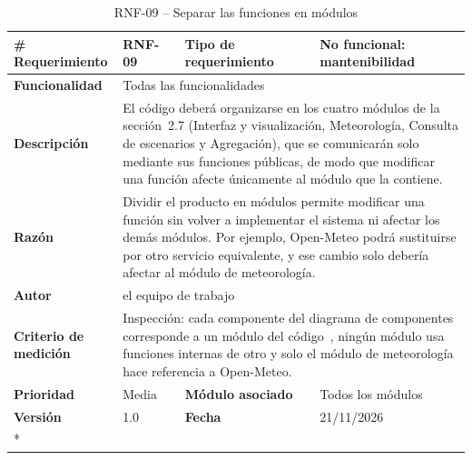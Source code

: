 \begin{longtable}{|p{\rqA}|p{\rqB}|p{\rqC}|p{\rqD}|}
  \caption{RNF-09 -- Separar las funciones en módulos}\label{tab:rnf-09}\tabularnewline
  \hline
  \textbf{\# Requerimiento} & RNF-09 & \raggedright\textbf{Tipo de requerimiento} & No funcional: mantenibilidad\tabularnewline\hline
  \raggedright\textbf{Funcionalidad} & \multicolumn{3}{p{\rqBCD}|}{Todas las funcionalidades}\tabularnewline\hline
  \endfirsthead
  \textbf{Descripción} & \multicolumn{3}{p{\rqBCD}|}{El código deberá organizarse en los cuatro módulos de la sección~2.7 (Interfaz y visualización, Meteorología, Consulta de escenarios y Agregación), que se comunicarán solo mediante sus funciones públicas, de modo que modificar una función afecte únicamente al módulo que la contiene.}\tabularnewline\hline
  \textbf{Razón} & \multicolumn{3}{p{\rqBCD}|}{Dividir el producto en módulos permite modificar una función sin volver a implementar el sistema ni afectar los demás módulos. Por ejemplo, Open-Meteo podrá sustituirse por otro servicio equivalente, y ese cambio solo debería afectar al módulo de meteorología.}\tabularnewline\hline
  \textbf{Autor} & \multicolumn{3}{p{\rqBCD}|}{el equipo de trabajo}\tabularnewline\hline
  \raggedright\textbf{Criterio de medición} & \multicolumn{3}{p{\rqBCD}|}{Inspección: cada componente del diagrama de componentes corresponde a un módulo del código~\cite{pmp2026}, ningún módulo usa funciones internas de otro y solo el módulo de meteorología hace referencia a Open-Meteo.}\tabularnewline\hline
  \textbf{Prioridad} & Media & \raggedright\textbf{Módulo asociado} & Todos los módulos\tabularnewline\hline
  \textbf{Versión} & 1.0 & \textbf{Fecha} & 21/11/2026\tabularnewline*\cline{1-4}
\end{longtable}


